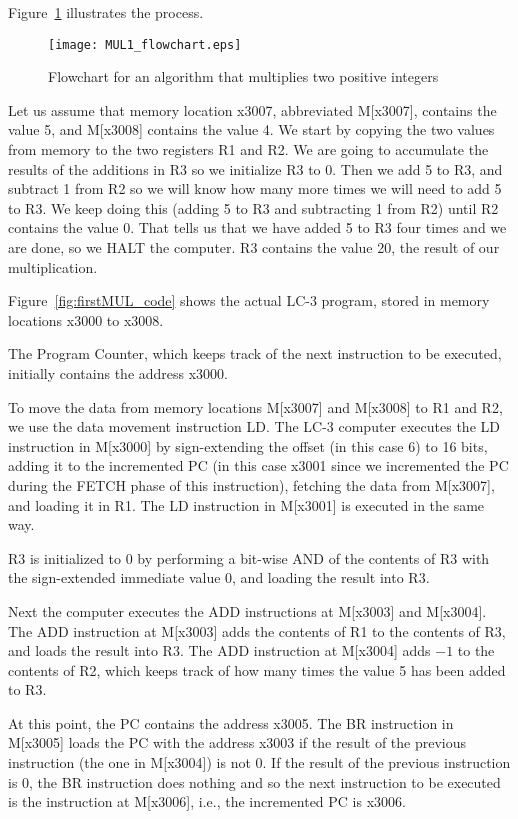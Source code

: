 \documentclass{patt}
\begin{document}
Figure~\ref{fig:MUL1_flow} illustrates the process.

\begin{figure}
\centerline{\texttt{[image: MUL1\_flowchart.eps]}}
\caption{Flowchart for an algorithm that multiplies two positive integers}
\label{fig:MUL1_flow}
\end{figure}

Let us assume that memory location x3007, abbreviated M[x3007], contains 
the value 5, and M[x3008] contains the
value 4.  We start by copying the two values from memory to the two registers 
R1 and R2.  We are going to accumulate the results of the additions in R3 so 
we initialize R3 to 0.  Then we add 5 to R3, and subtract 1 from R2 so we will 
know how many more times we will need to add 5 to R3.  We keep doing this 
(adding 5 to R3 and subtracting 1 from R2) until R2 contains the value 0.  
That tells us that we have added 5 to R3 four times and we are done, so we HALT
the computer.  R3 contains the value 20, the result of our multiplication.

Figure~\ref{fig:firstMUL_code} shows the actual LC-3 program, stored in
memory locations x3000 to x3008.  

The Program Counter, which keeps track of the next instruction to be executed,
initially contains the address x3000.

To move the data from memory locations M[x3007] and M[x3008] to R1 and R2, 
we use the data
movement instruction LD.  The LC-3 computer executes the LD instruction in
M[x3000] by sign-extending the offset (in this case 6) to 16 bits, adding it 
to the incremented PC (in this case x3001 since we incremented the PC during
the FETCH phase of this instruction), fetching the data from M[x3007], 
and loading it in R1.  The LD instruction in M[x3001] is executed in the same
way.

R3 is initialized to 0 by performing a bit-wise AND of the contents of R3 with
the sign-extended immediate value 0, and loading the result into R3.

Next the computer executes the ADD instructions at M[x3003] and M[x3004].
The ADD instruction at M[x3003] adds the contents of R1 to the contents of R3,
and loads the result into R3.  The ADD instruction at M[x3004] adds $-1$
to the contents of R2, which keeps track of how many times the value 5 has 
been added to R3.  

At this point, the PC contains the address x3005.  The BR instruction in 
M[x3005] loads the PC with the address x3003 if the result of the previous
instruction (the one in M[x3004]) is not 0.  If the result of the previous
instruction is 0, the BR instruction does nothing and so the next instruction
to be executed is the instruction at M[x3006], i.e., the incremented PC is
x3006.
\end{document}
